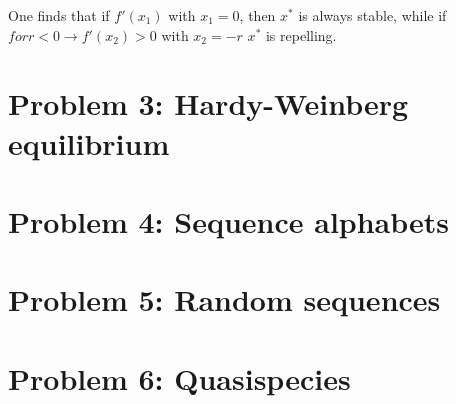 One finds that if $ f'(x_1) $ with $x_1 = 0$, then $x^{\ast}$ is always stable, while if $ for r < 0 \rightarrow f'(x_2) > 0 $ with $x_2 = -r $ $x^{\ast}$ is repelling.



\setcounter{chapter}{3}
\setcounter{section}{0}
\section{Problem 3: Hardy-Weinberg equilibrium}

\setcounter{chapter}{4}
\setcounter{section}{0}
\section{Problem 4: Sequence alphabets}

\setcounter{chapter}{5}
\setcounter{section}{0}
\section{Problem 5: Random sequences}

\setcounter{chapter}{6}
\setcounter{section}{0}
\section{Problem 6: Quasispecies}